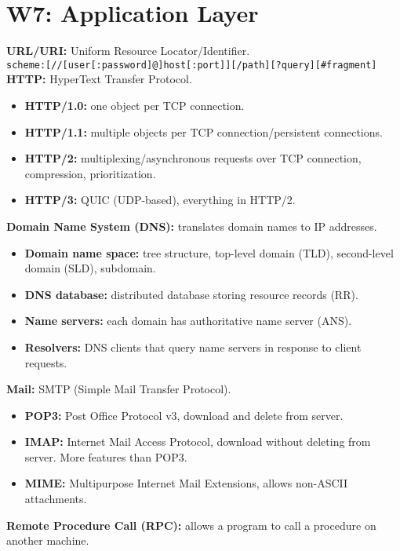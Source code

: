 \section{W7: Application Layer}
\textbf{URL/URI:} Uniform Resource Locator/Identifier.\\
{\tiny \verb|scheme:[//[user[:password]@]host[:port]][/path][?query][#fragment]|}\\
\textbf{HTTP:} HyperText Transfer Protocol.\\
\begin{itemize}
    \item \textbf{HTTP/1.0:} one object per TCP connection.
    \item \textbf{HTTP/1.1:} multiple objects per TCP connection/persistent connections.
    \item \textbf{HTTP/2:} multiplexing/asynchronous requests over TCP connection, compression, prioritization.
    \item \textbf{HTTP/3:} QUIC (UDP-based), everything in HTTP/2.
\end{itemize}
\textbf{Domain Name System (DNS):} translates domain names to IP addresses.\\
\begin{itemize}
    \item \textbf{Domain name space:} tree structure, top-level domain (TLD), second-level domain (SLD), subdomain.
    \item \textbf{DNS database:} distributed database storing resource records (RR).
    \item \textbf{Name servers:} each domain has authoritative name server (ANS).
    \item \textbf{Resolvers:} DNS clients that query name servers in response to client requests.
\end{itemize}
\textbf{Mail:} SMTP (Simple Mail Transfer Protocol).\\
\begin{itemize}
    \item \textbf{POP3:} Post Office Protocol v3, download and delete from server.
    \item \textbf{IMAP:} Internet Mail Access Protocol, download without deleting from server. More features than POP3.
    \item \textbf{MIME:} Multipurpose Internet Mail Extensions, allows non-ASCII attachments.
\end{itemize}
\textbf{Remote Procedure Call (RPC):} allows a program to call a procedure on another machine.\\
